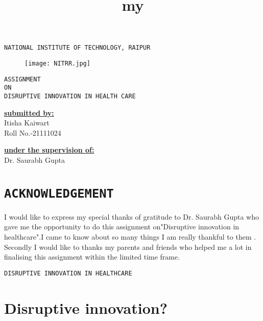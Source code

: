 \documentclass[12pt]{article}
\title{my}
\begin{document}
\centering\huge\texttt{NATIONAL INSTITUTE OF TECHNOLOGY, RAIPUR}\\

\begin{figure}[h]
\centering
\texttt{[image: NITRR.jpg]}
\end{figure}

\begin{center}


\huge\texttt{ASSIGNMENT \\ON\\ DISRUPTIVE INNOVATION IN HEALTH CARE}

\end{center}

\begin{minipage}[t]{5cm}
\flushleft\Large\textbf{\underline{submitted by:}}\\
Itisha Kaiwart\\
Roll No.-21111024
\end{minipage}
\hfill
\begin{minipage}[t]{5cm}
\Large\textbf{\underline{under the supervision of:}}\\
Dr. Saurabh Gupta
\end{minipage}


\pagebreak
\tableofcontents
\pagebreak

\section{\Large\centering\texttt{ACKNOWLEDGEMENT}}

\large \flushleft I would like to express my special thanks of gratitude to Dr. Saurabh Gupta who gave me the opportunity to do this assignment on"Disruptive innovation in healthcare".I came to know about so many things I am really thankful to them .\\



\vspace{1cm}
Secondly I would like to thanks my parents and friends who helped me a lot in finalising this assignment within the limited time frame.

\pagebreak




\centering\huge\texttt{DISRUPTIVE INNOVATION IN HEALTHCARE}\\



\vspace{0.8cm}
\flushleft\section{\large\textbf{Disruptive innovation?}}
\end{document}
